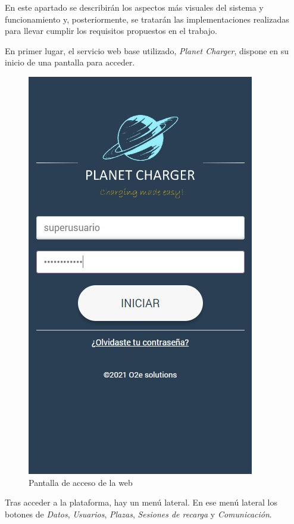 \documentclass[12pt,a4paper,onecolumn,oneside]{report}
\begin{document}
En este apartado se describirán los aspectos más visuales del sistema y funcionamiento y, posteriormente, se tratarán las implementaciones realizadas para llevar cumplir los requisitos propuestos en el trabajo.

En primer lugar, el servicio web base utilizado, \textit{Planet Charger}, dispone en su inicio de una pantalla para acceder.

\begin{figure}[H] 
\centering
  \includegraphics[width=.5\textwidth]{figuras/design1.png}
  \caption[Pantalla de acceso de la web]{Pantalla de acceso de la web\\
  }
  \label{fig:design1}
\end{figure}

Tras acceder a la plataforma, hay un menú lateral. En ese menú lateral los botones de \textit{Datos}, \textit{Usuarios}, \textit{Plazas}, \textit{Sesiones de recarga} y \textit{Comunicación}.
\end{document}
